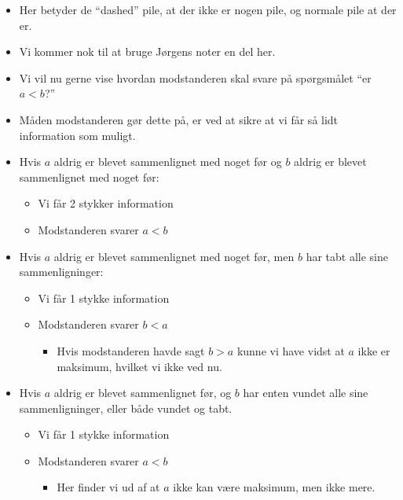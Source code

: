 \begin{frame}[allowframebreaks]
\begin{center}
	\end{center}
	\begin{itemize}
		\item Her betyder de ``dashed'' pile, at der ikke er nogen pile, og normale pile at der er.
		\item Vi kommer nok til at bruge Jørgens noter en del her.
		\item Vi vil nu gerne vise hvordan modstanderen skal svare på spørgsmålet ``er $a < b$?''
		\item Måden modstanderen gør dette på, er ved at sikre at vi får så lidt information som muligt.
		\item Hvis $a$ aldrig er blevet sammenlignet med noget før og $b$ aldrig er blevet sammenlignet med noget før:
		      \begin{itemize}
			      \item Vi får 2 stykker information
			      \item Modstanderen svarer $a < b$
		      \end{itemize}
		\item Hvis $a$ aldrig er blevet sammenlignet med noget før, men $b$ har tabt alle sine sammenligninger:
		      \begin{itemize}
			      \item Vi får 1 stykke information
			      \item Modstanderen svarer $b < a$
			            \begin{itemize}
				            \item Hvis modstanderen havde sagt $b > a$ kunne vi have vidst at $a$ ikke er maksimum, hvilket vi ikke ved nu.
			            \end{itemize}
		      \end{itemize}

		\item Hvis $a$ aldrig er blevet sammenlignet før, og $b$ har enten vundet alle sine sammenligninger, eller både vundet og tabt.
		      \begin{itemize}
			      \item Vi får 1 stykke information
			      \item Modstanderen svarer $a < b$
			            \begin{itemize}
				            \item Her finder vi ud af at $a$ ikke kan være maksimum, men ikke mere.
			            \end{itemize}
		      \end{itemize}


\end{itemize}
\end{frame}
